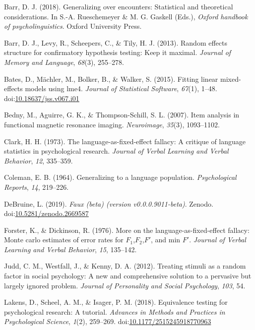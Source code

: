 \documentclass[man,floatsintext]{apa6}
\begin{document}
\hypertarget{ref-barr_2018}{}
Barr, D. J. (2018). Generalizing over encounters: Statistical and
theoretical considerations. In S.-A. Rueschemeyer \& M. G. Gaskell
(Eds.), \emph{Oxford handbook of psycholinguistics}. Oxford University
Press.

\hypertarget{ref-barr_et_al_2013}{}
Barr, D. J., Levy, R., Scheepers, C., \& Tily, H. J. (2013). Random
effects structure for confirmatory hypothesis testing: Keep it maximal.
\emph{Journal of Memory and Language}, \emph{68}(3), 255--278.

\hypertarget{ref-R-lme4}{}
Bates, D., Mächler, M., Bolker, B., \& Walker, S. (2015). Fitting linear
mixed-effects models using lme4. \emph{Journal of Statistical Software},
\emph{67}(1), 1--48.
doi:\href{https://doi.org/10.18637/jss.v067.i01}{10.18637/jss.v067.i01}

\hypertarget{ref-bedny_aguirre_thompson-schill_2007}{}
Bedny, M., Aguirre, G. K., \& Thompson-Schill, S. L. (2007). Item
analysis in functional magnetic resonance imaging. \emph{Neuroimage},
\emph{35}(3), 1093--1102.

\hypertarget{ref-clark_1973}{}
Clark, H. H. (1973). The language-as-fixed-effect fallacy: A critique of
language statistics in psychological research. \emph{Journal of Verbal
Learning and Verbal Behavior}, \emph{12}, 335--359.

\hypertarget{ref-coleman_1964}{}
Coleman, E. B. (1964). Generalizing to a language population.
\emph{Psychological Reports}, \emph{14}, 219--226.

\hypertarget{ref-R-faux}{}
DeBruine, L. (2019). \emph{Faux (beta) (version v0.0.0.9011-beta)}.
Zenodo.
doi:\href{https://doi.org/10.5281/zenodo.2669587}{10.5281/zenodo.2669587}

\hypertarget{ref-forster_dickinson_1976}{}
Forster, K., \& Dickinson, R. (1976). More on the
language-as-fixed-effect fallacy: Monte carlo estimates of error rates
for \(F_1\),\(F_2\),\(F'\), and min \(F'\). \emph{Journal of Verbal
Learning and Verbal Behavior}, \emph{15}, 135--142.

\hypertarget{ref-judd_westfall_kenny_2012}{}
Judd, C. M., Westfall, J., \& Kenny, D. A. (2012). Treating stimuli as a
random factor in social psychology: A new and comprehensive solution to
a pervasive but largely ignored problem. \emph{Journal of Personality
and Social Psychology}, \emph{103}, 54.

\hypertarget{ref-TOSTtutorial}{}
Lakens, D., Scheel, A. M., \& Isager, P. M. (2018). Equivalence testing
for psychological research: A tutorial. \emph{Advances in Methods and
Practices in Psychological Science}, \emph{1}(2), 259--269.
doi:\href{https://doi.org/10.1177/2515245918770963}{10.1177/2515245918770963}
\end{document}
